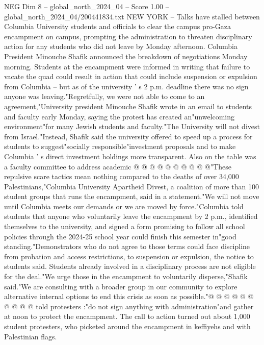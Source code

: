 \begin{textsample}{NEG Dim 8 – global\_north\_2024\_04 – Score 1.00 – global\_north\_2024\_04/200441834.txt}  \label{ex:f8_neg_405}
NEW YORK -- Talks have stalled between Columbia University students and officials to clear the campus pro-Gaza encampment on campus, prompting the administration to threaten disciplinary action for any students who did not leave by Monday afternoon.
Columbia President Minouche Shafik announced the breakdown of negotiations Monday morning.
Students at the encampment were informed in writing that failure to vacate the quad could result in action that could include suspension or expulsion from Columbia -- but as of the university ' s 2 p.m. deadline there was no sign anyone was leaving."Regretfully, we were not able to come to an agreement,"University president Minouche Shafik wrote in an email to students and faculty early Monday, saying the protest has created an"unwelcoming environment"for many Jewish students and faculty."The University will not divest from Israel."Instead, Shafik said the university offered to speed up a process for students to suggest"socially responsible"investment proposals and to make Columbia ' s direct investment holdings more transparent.
Also on the table was a faculty committee to address academic @ @ @ @ @ @ @ @ @ @"These repulsive scare tactics mean nothing compared to the deaths of over 34,000 Palestinians,"Columbia University Apartheid Divest, a coalition of more than 100 student groups that runs the encampment, said in a statement."We will not move until Columbia meets our demands or we are moved by force."Columbia told students that anyone who voluntarily leave the encampment by 2 p.m., identified themselves to the university, and signed a form promising to follow all school policies through the 2024-25 school year could finish this semester in"good standing."Demonstrators who do not agree to those terms could face discipline from probation and access restrictions, to suspension or expulsion, the notice to students said.
Students already involved in a disciplinary process are not eligible for the deal."We urge those in the encampment to voluntarily disperse,"Shafik said."We are consulting with a broader group in our community to explore alternative internal options to end this crisis as soon as possible."@ @ @ @ @ @ @ @ @ @ told protesters :"do not sign anything with administration"and gather at noon to protect the encampment.
The call to action turned out about 1,000 student protesters, who picketed around the encampment in keffiyehs and with Palestinian flags.

\end{textsample}
